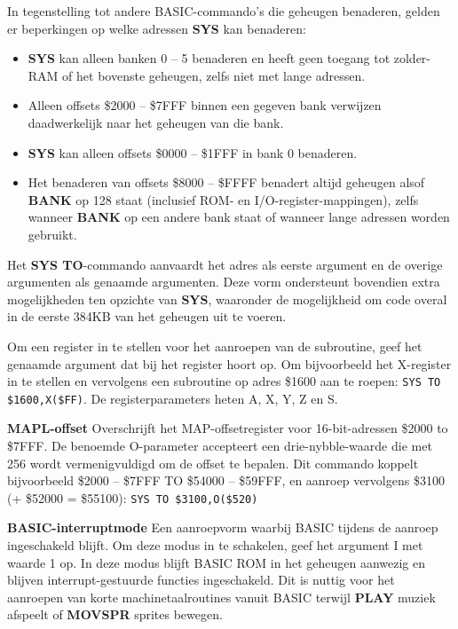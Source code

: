 \begin{description}[leftmargin=2cm,style=nextline]
                  In tegenstelling tot andere BASIC-commando's die geheugen benaderen, gelden er beperkingen op welke adressen {\bf SYS} kan benaderen:

                  \begin{itemize}
                     \item {\bf SYS} kan alleen banken 0 -- 5 benaderen en heeft geen toegang tot zolder-RAM of het bovenste geheugen, zelfs niet met lange adressen.                     \item Alleen offsets \$2000 -- \$7FFF binnen een gegeven bank verwijzen daadwerkelijk naar het geheugen van die bank.                     \item {\bf SYS} kan alleen offsets \$0000 -- \$1FFF in bank 0 benaderen.                     \item Het benaderen van offsets \$8000 -- \$FFFF benadert altijd geheugen alsof {\bf BANK} op 128 staat (inclusief ROM- en I/O-register-mappingen), zelfs wanneer {\bf BANK} op een andere bank staat of wanneer lange adressen worden gebruikt.
                  \end{itemize}

\item [SYS TO-vorm:] Het {\bf SYS TO}-commando aanvaardt het adres als eerste argument en de overige argumenten als genaamde argumenten. Deze vorm ondersteunt bovendien extra mogelijkheden ten opzichte van {\bf SYS}, waaronder de mogelijkheid om code overal in de eerste 384KB van het geheugen uit te voeren.

                  Om een register in te stellen voor het aanroepen van de subroutine, geef het genaamde argument dat bij het register hoort op. Om bijvoorbeeld het X-register in te stellen en vervolgens een subroutine op adres \$1600 aan te roepen: \texttt{SYS TO \$1600,X(\$FF)}. De registerparameters heten A, X, Y, Z en S.

                  {\bf MAPL-offset} Overschrijft het MAP-offsetregister voor 16-bit-adressen \$2000 to \$7FFF. De benoemde O-parameter accepteert een drie-nybble-waarde die met 256 wordt vermenigvuldigd om de offset te bepalen. Dit commando koppelt bijvoorbeeld \$2000 -- \$7FFF TO \$54000 -- \$59FFF, en aanroep vervolgens \$3100 (+ \$52000 = \$55100): \texttt{SYS TO \$3100,O(\$520)}

                  {\bf BASIC-interruptmode} Een aanroepvorm waarbij BASIC tijdens de aanroep ingeschakeld blijft. Om deze modus in te schakelen, geef het argument I met waarde 1 op. In deze modus blijft BASIC ROM in het geheugen aanwezig en blijven interrupt-gestuurde functies ingeschakeld. Dit is nuttig voor het aanroepen van korte machinetaalroutines vanuit BASIC terwijl {\bf PLAY} muziek afspeelt of {\bf MOVSPR} sprites bewegen.


\end{description}
